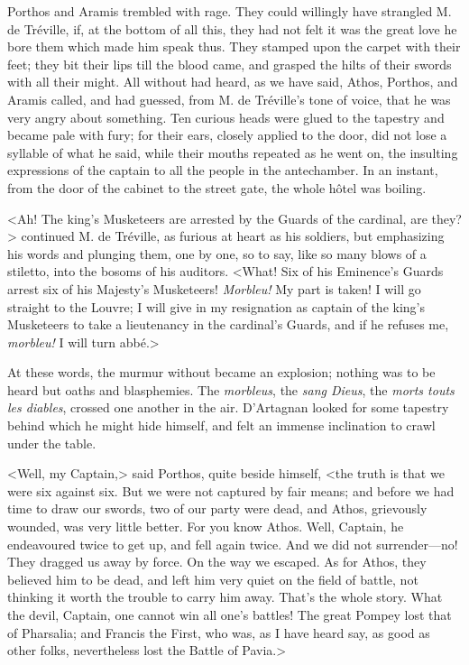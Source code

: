 Porthos and Aramis trembled with rage. They could willingly have strangled M. de Tréville, if, at the bottom of all this, they had not felt it was the great love he bore them which made him speak thus. They stamped upon the carpet with their feet; they bit their lips till the blood came, and grasped the hilts of their swords with all their might. All without had heard, as we have said, Athos, Porthos, and Aramis called, and had guessed, from M. de Tréville's tone of voice, that he was very angry about something. Ten curious heads were glued to the tapestry and became pale with fury; for their ears, closely applied to the door, did not lose a syllable of what he said, while their mouths repeated as he went on, the insulting expressions of the captain to all the people in the antechamber. In an instant, from the door of the cabinet to the street gate, the whole hôtel was boiling. 

<Ah! The king's Musketeers are arrested by the Guards of the cardinal, are they?> continued M. de Tréville, as furious at heart as his soldiers, but emphasizing his words and plunging them, one by one, so to say, like so many blows of a stiletto, into the bosoms of his auditors. <What! Six of his Eminence's Guards arrest six of his Majesty's Musketeers! \textit{Morbleu!} My part is taken! I will go straight to the Louvre; I will give in my resignation as captain of the king's Musketeers to take a lieutenancy in the cardinal's Guards, and if he refuses me, \textit{morbleu!} I will turn abbé.> 

At these words, the murmur without became an explosion; nothing was to be heard but oaths and blasphemies. The \textit{morbleus}, the \textit{sang Dieus}, the \textit{morts touts les diables}, crossed one another in the air. D'Artagnan looked for some tapestry behind which he might hide himself, and felt an immense inclination to crawl under the table. 

<Well, my Captain,> said Porthos, quite beside himself, <the truth is that we were six against six. But we were not captured by fair means; and before we had time to draw our swords, two of our party were dead, and Athos, grievously wounded, was very little better. For you know Athos. Well, Captain, he endeavoured twice to get up, and fell again twice. And we did not surrender---no! They dragged us away by force. On the way we escaped. As for Athos, they believed him to be dead, and left him very quiet on the field of battle, not thinking it worth the trouble to carry him away. That's the whole story. What the devil, Captain, one cannot win all one's battles! The great Pompey lost that of Pharsalia; and Francis the First, who was, as I have heard say, as good as other folks, nevertheless lost the Battle of Pavia.> 

